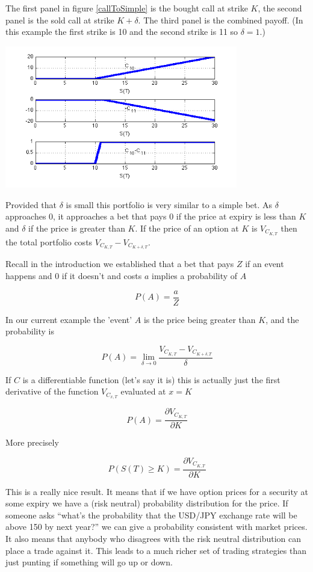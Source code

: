 The first panel in figure \ref{callToSimple} is the bought call at strike $K$, the second panel is the sold call at strike $K+\delta$. The third panel is the combined payoff. (In this example the first strike is 10 and the second strike is 11 so $\delta = 1$.)
 
 \begin{center}
\includegraphics[width=4in]{pics/callspread}%
\label{callToSimple}%
\end{center}
 

Provided that $\delta$ is small this portfolio is very similar to a simple bet. As $\delta$ approaches 0, it approaches a bet that pays 0 if the price at expiry is less than $K$ and $\delta$  if the price is greater than $K$. If the price of an option at $K$ is $V_{C_{K,T}}$ then the total portfolio costs $V_{C_{K,T}}-V_{C_{K+\delta,T}}$.

Recall in the introduction we established that a bet that pays $Z$ if an event happens and $0$ if it doesn't and costs $a$ implies a probability of $A$

\[P(A) = \frac{a}{Z}\]

In our current example the 'event' $A$ is the price being greater than $K$, and the probability is

\[P(A) = \lim_{\delta \rightarrow 0} \frac{V_{C_{K,T}}-V_{C_{K+\delta,T}}}{\delta} \]

If $C$ is a differentiable function (let's say it is) this is actually just the first derivative of the function $V_{C_{x,T}}$ evaluated at $x=K$

\[ P(A) = \frac{\partial V_{C_{K,T}}}{\partial K} \]

More precisely

\[ P(S(T) \geq K) = \frac{\partial V_{C_{K,T}}}{\partial K}\]

This is a really nice result. It means that if we have option prices for a security at some expiry we have a (risk neutral) probability distribution for the price. If someone asks ``what's the probability that the USD/JPY exchange rate will be above 150 by next year?'' we can give a probability consistent with market prices. It also means that anybody who disagrees with the risk neutral distribution can place a trade against it. This leads to a much richer set of trading strategies than just punting if something will go up or down.

